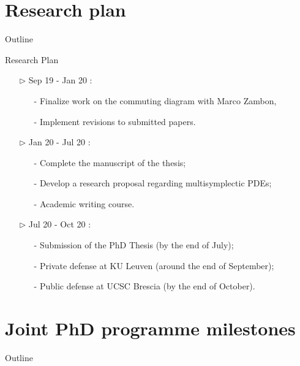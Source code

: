 \documentclass[handout,10pt]{beamer}
\newcommand{\checkpoint}[0]{
	\ifHandout

	\else
	\addtocounter{framenumber}{-1}
 	\begin{frame}{Outline}
  		\tableofcontents[currentsection]
	\end{frame}
	\fi
}
\begin{document}
\section{Research plan}
\checkpoint
\begin{frame}{Research Plan}




\color{green!80!black}
\begin{itemize}
	\item[\color{green!80!black}$\triangleright$] Sep 19 - Jan 20 :\color{black}
		\begin{itemize}
			\item[-] Finalize work on the commuting diagram with Marco Zambon,
			\item[-] Implement revisions to submitted papers.
		\end{itemize}
		\color{orange}
	\item[\color{orange}$\triangleright$] Jan 20 - Jul 20 :\color{black}
		\begin{itemize}%
			\item[-] Complete the manuscript of the thesis;
			\item[-] Develop a research proposal regarding multisymplectic PDEs;
			\item[-] Academic writing course.	
		\end{itemize}
		\color{red}
	\item[\color{red}$\triangleright$] Jul 20 - Oct 20 :\color{black}
		\begin{itemize}%
			\item[-] Submission of the PhD Thesis (by the end of July);
			\item[-] Private defense at KU Leuven (around the end of September);
			\item[-] Public defense at UCSC Brescia	(by the end of October).
		\end{itemize}		
\end{itemize}

\end{frame}

\section{Joint PhD programme milestones}
\checkpoint
\end{document}
